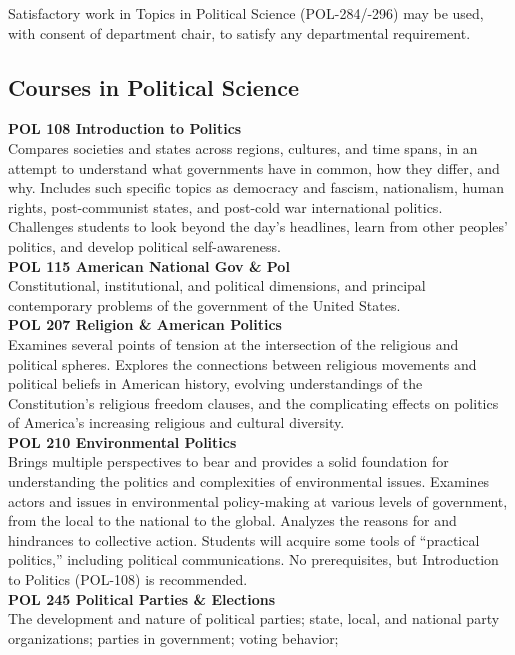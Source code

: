\documentclass[
  letterpaper,
]{scrbook}
\begin{document}
Satisfactory work in Topics in Political Science (POL-284/-296) may be
used, with consent of department chair, to satisfy any departmental
requirement.

\subsection{Courses in Political
Science}\label{courses-in-political-science}

\textbf{POL 108 Introduction to Politics}\\
Compares societies and states across regions, cultures, and time spans,
in an attempt to understand what governments have in common, how they
differ, and why. Includes such specific topics as democracy and fascism,
nationalism, human rights, post-communist states, and post-cold war
international politics. Challenges students to look beyond the day's
headlines, learn from other peoples' politics, and develop political
self-awareness.\\
\textbf{POL 115 American National Gov \& Pol}\\
Constitutional, institutional, and political dimensions, and principal
contemporary problems of the government of the United States.\\
\textbf{POL 207 Religion \& American Politics}\\
Examines several points of tension at the intersection of the religious
and political spheres. Explores the connections between religious
movements and political beliefs in American history, evolving
understandings of the Constitution's religious freedom clauses, and the
complicating effects on politics of America's increasing religious and
cultural diversity.\\
\textbf{POL 210 Environmental Politics}\\
Brings multiple perspectives to bear and provides a solid foundation for
understanding the politics and complexities of environmental issues.
Examines actors and issues in environmental policy-making at various
levels of government, from the local to the national to the global.
Analyzes the reasons for and hindrances to collective action. Students
will acquire some tools of ``practical politics,'' including political
communications. No prerequisites, but Introduction to Politics (POL-108)
is recommended.\\
\textbf{POL 245 Political Parties \& Elections}\\
The development and nature of political parties; state, local, and
national party organizations; parties in government; voting behavior;
\end{document}
